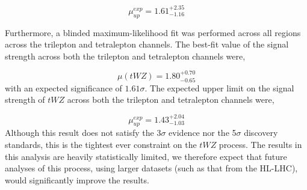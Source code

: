 \begin{equation}
  \mu_{up}^{exp} =   1.61^{+2.35}_{-1.16}
\end{equation}

Furthermore, a blinded maximum-likelihood fit was performed across all regions across the trilepton and tetralepton channels. The best-fit value of the signal strength across both the trilepton and tetralepton channels were,

\begin{equation}
  \mu (tWZ) =   1.80^{+0.70}_{-0.65}
\end{equation}
with an expected significance of $1.61\sigma$. The expected upper limit on the signal strength of $tWZ$ across both the trilepton and tetralepton channels were,

\begin{equation}
  \mu_{up}^{exp} =   1.43^{+2.04}_{-1.03}
\end{equation}
 Although this result does not satisfy the 3$\sigma$ evidence nor the 5$\sigma$ discovery standards, this is the tightest ever constraint on the $tWZ$ process. The results in this analysis are heavily statistically limited, we therefore expect that future analyses of this process, using larger datasets (such as that from the HL-LHC), would significantly improve the results.










